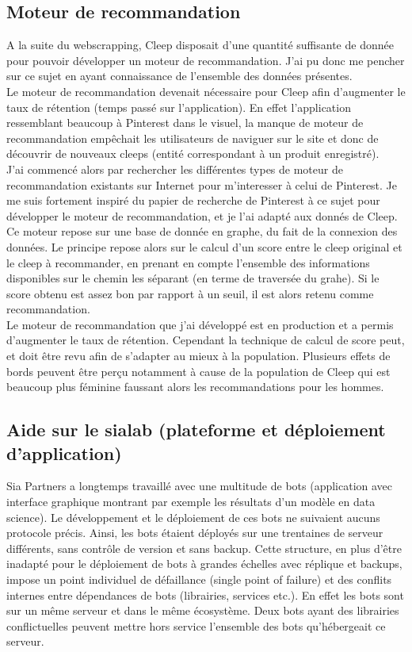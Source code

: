 \documentclass{article} %
\begin{document}
\subsection{Moteur de recommandation}
A la suite du webscrapping, Cleep disposait d'une quantité suffisante de donnée pour pouvoir développer un moteur de recommandation. J'ai pu donc me pencher sur ce sujet en ayant connaissance de l'ensemble des données présentes.\\

Le moteur de recommandation devenait nécessaire pour Cleep afin d'augmenter le taux de rétention (temps passé sur l'application). En effet l'application ressemblant beaucoup à Pinterest dans le visuel, la manque de moteur de recommandation empêchait les utilisateurs de naviguer sur le site et donc de découvrir de nouveaux cleeps (entité correspondant à un produit enregistré).\\

J'ai commencé alors par rechercher les différentes types de moteur de recommandation existants sur Internet pour m'interesser à celui de Pinterest. Je me suis fortement inspiré du papier de recherche de Pinterest à ce sujet pour développer le moteur de recommandation, et je l'ai adapté aux donnés de Cleep. Ce moteur repose sur une base de donnée en graphe, du fait de la connexion des données. Le principe repose alors sur le calcul d'un score entre le cleep original et le cleep à recommander, en prenant en compte l'ensemble des informations disponibles sur le chemin les séparant (en terme de traversée du grahe). Si le score obtenu est assez bon par rapport à un seuil, il est alors retenu comme recommandation.\\

Le moteur de recommandation que j'ai développé est en production et a permis d'augmenter le taux de rétention. Cependant la technique de calcul de score peut, et doit être revu afin de s'adapter au mieux à la population. Plusieurs effets de bords peuvent être perçu notamment à cause de la population de Cleep qui est beaucoup plus féminine faussant alors les recommandations pour les hommes.\\

\subsection{Aide sur le sialab (plateforme et déploiement d'application)}
Sia Partners a longtemps travaillé avec une multitude de bots (application avec interface graphique montrant par exemple les résultats d'un modèle en data science). Le développement et le déploiement de ces bots ne suivaient aucuns protocole précis. Ainsi, les bots étaient déployés sur une trentaines de serveur différents, sans contrôle de version et sans backup. Cette structure, en plus d'être inadapté pour le déploiement de bots à grandes échelles avec réplique et backups, impose un point individuel de défaillance (single point of failure) et des conflits internes entre dépendances de bots (librairies, services etc.). En effet les bots sont sur un même serveur et dans le même écosystème. Deux bots ayant des librairies conflictuelles peuvent mettre hors service l'ensemble des bots qu'hébergeait ce serveur.\\
\end{document}
